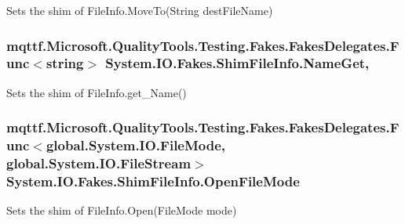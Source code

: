 Sets the shim of File\-Info.\-Move\-To(\-String dest\-File\-Name)

\hypertarget{class_system_1_1_i_o_1_1_fakes_1_1_shim_file_info_a673e2ce777e13d0e75ad971509dded3b}{
\subsubsection[{Name\-Get}]{\setlength{\rightskip}{0pt plus 5cm}mqttf.\-Microsoft.\-Quality\-Tools.\-Testing.\-Fakes.\-Fakes\-Delegates.\-Func$<$string$>$ System.\-I\-O.\-Fakes.\-Shim\-File\-Info.\-Name\-Get\hspace{0.3cm}{\ttfamily [get]}, {\ttfamily [set]}}}\label{class_system_1_1_i_o_1_1_fakes_1_1_shim_file_info_a673e2ce777e13d0e75ad971509dded3b}


Sets the shim of File\-Info.\-get\-\_\-\-Name()

\hypertarget{class_system_1_1_i_o_1_1_fakes_1_1_shim_file_info_ab3b38a4384078912f9430a08eba40b26}{
\subsubsection[{Open\-File\-Mode}]{\setlength{\rightskip}{0pt plus 5cm}mqttf.\-Microsoft.\-Quality\-Tools.\-Testing.\-Fakes.\-Fakes\-Delegates.\-Func$<$global.\-System.\-I\-O.\-File\-Mode, global.\-System.\-I\-O.\-File\-Stream$>$ System.\-I\-O.\-Fakes.\-Shim\-File\-Info.\-Open\-File\-Mode\hspace{0.3cm}{\ttfamily [set]}}}\label{class_system_1_1_i_o_1_1_fakes_1_1_shim_file_info_ab3b38a4384078912f9430a08eba40b26}


Sets the shim of File\-Info.\-Open(\-File\-Mode mode)

